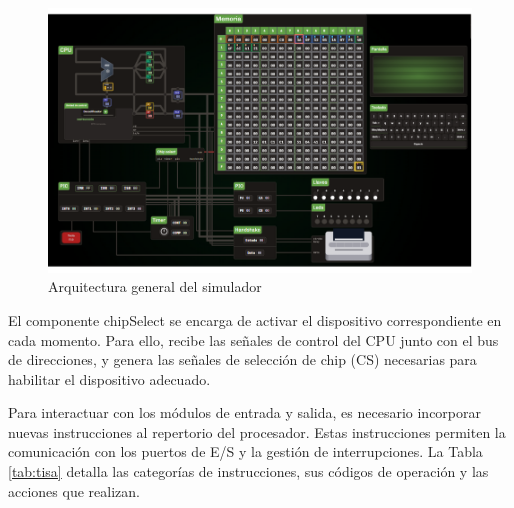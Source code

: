 \documentclass[12pt,oneside]{templates/unerthesis}
\begin{document}
\begin{figure}

{\centering \includegraphics[width=1\linewidth]{images/esquemavonsim8} 

}

\caption{Arquitectura general del simulador}\label{fig:dispositivos}
\end{figure}

El componente chipSelect se encarga de activar el dispositivo correspondiente en cada momento. Para ello, recibe las señales de control del CPU junto con el bus de direcciones, y genera las señales de selección de chip (CS) necesarias para habilitar el dispositivo adecuado.

Para interactuar con los módulos de entrada y salida, es necesario incorporar nuevas instrucciones al repertorio del procesador. Estas instrucciones permiten la comunicación con los puertos de E/S y la gestión de interrupciones. La Tabla \ref{tab:tisa} detalla las categorías de instrucciones, sus códigos de operación y las acciones que realizan.
\end{document}
